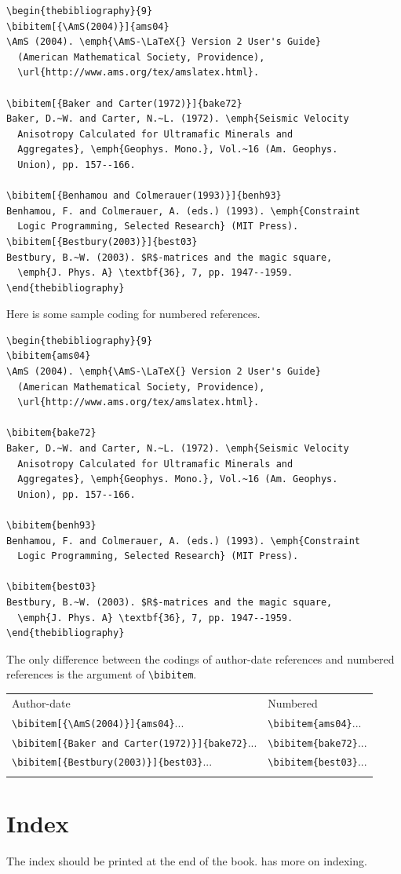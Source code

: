 \begin{verbatim}
\begin{thebibliography}{9}
\bibitem[{\AmS(2004)}]{ams04}
\AmS (2004). \emph{\AmS-\LaTeX{} Version 2 User's Guide}
  (American Mathematical Society, Providence),
  \url{http://www.ams.org/tex/amslatex.html}.

\bibitem[{Baker and Carter(1972)}]{bake72}
Baker, D.~W. and Carter, N.~L. (1972). \emph{Seismic Velocity
  Anisotropy Calculated for Ultramafic Minerals and
  Aggregates}, \emph{Geophys. Mono.}, Vol.~16 (Am. Geophys.
  Union), pp. 157--166.

\bibitem[{Benhamou and Colmerauer(1993)}]{benh93}
Benhamou, F. and Colmerauer, A. (eds.) (1993). \emph{Constraint
  Logic Programming, Selected Research} (MIT Press).
\bibitem[{Bestbury(2003)}]{best03}
Bestbury, B.~W. (2003). $R$-matrices and the magic square,
  \emph{J. Phys. A} \textbf{36}, 7, pp. 1947--1959.
\end{thebibliography}
\end{verbatim}

Here is some sample coding for numbered references.

\begin{verbatim}
\begin{thebibliography}{9}
\bibitem{ams04}
\AmS (2004). \emph{\AmS-\LaTeX{} Version 2 User's Guide}
  (American Mathematical Society, Providence),
  \url{http://www.ams.org/tex/amslatex.html}.

\bibitem{bake72}
Baker, D.~W. and Carter, N.~L. (1972). \emph{Seismic Velocity
  Anisotropy Calculated for Ultramafic Minerals and
  Aggregates}, \emph{Geophys. Mono.}, Vol.~16 (Am. Geophys.
  Union), pp. 157--166.

\bibitem{benh93}
Benhamou, F. and Colmerauer, A. (eds.) (1993). \emph{Constraint
  Logic Programming, Selected Research} (MIT Press).

\bibitem{best03}
Bestbury, B.~W. (2003). $R$-matrices and the magic square,
  \emph{J. Phys. A} \textbf{36}, 7, pp. 1947--1959.
\end{thebibliography}
\end{verbatim}

The only difference between the codings of author-date references
and numbered references is the argument of \verb|\bibitem|.

\begin{center}\tablefont
\begin{tabular}{@{}ll@{}}\toprule
Author-date & Numbered\\\colrule
\verb|\bibitem[{\AmS(2004)}]{ams04}|... &\verb|\bibitem{ams04}|...\\
\verb|\bibitem[{Baker and Carter(1972)}]{bake72}|... &\verb|\bibitem{bake72}|...\\
\verb|\bibitem[{Bestbury(2003)}]{best03}|... &\verb|\bibitem{best03}|...\\
\botrule
\end{tabular}
\end{center}

\section{Index}
The index should be printed at the end of the book.  has more
on indexing.
